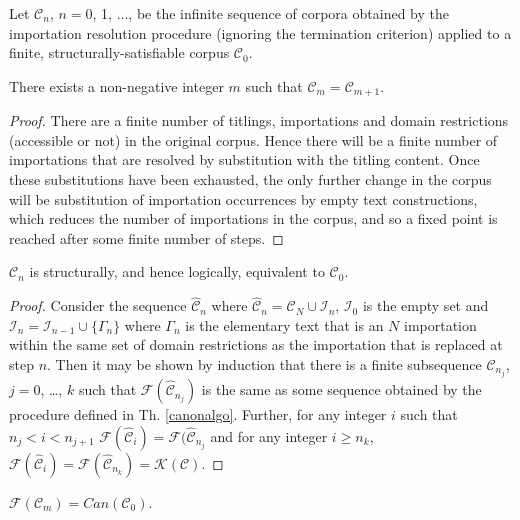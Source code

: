 \documentclass{IOS-Book-Article}
\newcommand{\corp}{ \mathcal{C} }
\newcommand{\corphat}{ \hat{\mathcal{C}} }
\newcommand{\Formal}{\mathcal{F}}
\newcommand{\Core}{\mathcal{K}}
\newcommand{\Canon}{\mathit{Can}}
\begin{document}
Let $\corp_n$, $n=$0, 1, $\ldots$, be the infinite sequence of corpora obtained by the importation resolution procedure (ignoring the termination criterion) applied to a finite, structurally-satisfiable corpus $\corp_0$.
\begin{theo}
\label{termination}
There exists a non-negative integer $m$ such that $\corp_{m}=\corp_{m+1}$. 
\begin{proof}
There are a finite number of titlings, importations and domain restrictions (accessible or not) in the original corpus.
Hence there will be a finite number of importations that are resolved by substitution with the titling content.
Once these substitutions have been exhausted, the only further change in the corpus will be substitution of importation occurrences by empty text  constructions, which reduces the number of importations in the corpus, and so a fixed point is reached after some finite number of steps.
\end{proof}
\end{theo}

\begin{theo}
\label{resolve}
$\corp_n$ is structurally, and hence logically, equivalent to $\corp_0$.
\begin{proof} Consider the sequence $\corphat_n$ where $\corphat_n = \corp_N \cup \mathcal{I}_n$, $\mathcal{I}_0$ is the empty set and $\mathcal{I}_n = \mathcal{I}_{n-1} \cup \{\Gamma_n\}$ where $\Gamma_n$ is the elementary text that is an $N$ importation within the same set of domain restrictions as the importation that is replaced at step $n$. 
Then it may be shown by induction that there is a finite subsequence $\corp_{n_j}$,  $j=$0, \ldots, $k$ such that $\Formal(\corphat_{n_j})$ is the same as some sequence obtained by the procedure defined in Th. \ref{canonalgo}. Further, for any integer $i$ such that $n_j < i < n_{j+1}$ $\Formal(\corphat_i) = \Formal(\corphat_{n_j}$ and for any integer $i \ge n_k$, $\Formal(\corphat_i) = \Formal(\corphat_{n_k}) = \Core(\corp)$.
\end{proof}
\end{theo}


\begin{cor}
$\Formal(\corp_m) = \Canon(\corp_0)$.
\end{cor}









\end{document}
